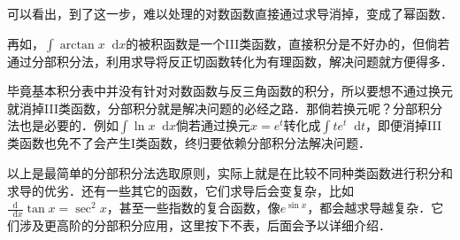 \documentclass{ctexbook}
\newcommand*{\dif}{\mathop{}\!\mathrm{d}}
\begin{document}
可以看出，到了这一步，难以处理的对数函数直接通过求导消掉，变成了幂函数．\par
再如，$\int\arctan{x}\dif{x}$的被积函数是一个III类函数，直接积分是不好办的，但倘若通过分部积分法，利用求导将反正切函数转化为有理函数，解决问题就方便得多．\par
毕竟基本积分表中并没有针对对数函数与反三角函数的积分，所以要想不通过换元就消掉III类函数，分部积分就是解决问题的必经之路．那倘若换元呢？分部积分法也是必要的．例如$\int\ln{x}\dif{x}$倘若通过换元$x=e^{t}$转化成$\int te^{t}\dif{t}$，即便消掉III类函数也免不了会产生I类函数，终归要依赖分部积分法解决问题．\par
以上是最简单的分部积分法选取原则，实际上就是在比较不同种类函数进行积分和求导的优劣．还有一些其它的函数，它们求导后会变复杂，比如$\frac{\mathrm{d}}{\dif{x}}\tan{x}=\sec^{2}{x}$，甚至一些指数的复合函数，像$e^{\sin{x}}$，都会越求导越复杂．它们涉及更高阶的分部积分应用，这里按下不表，后面会予以详细介绍．\par
\end{document}
